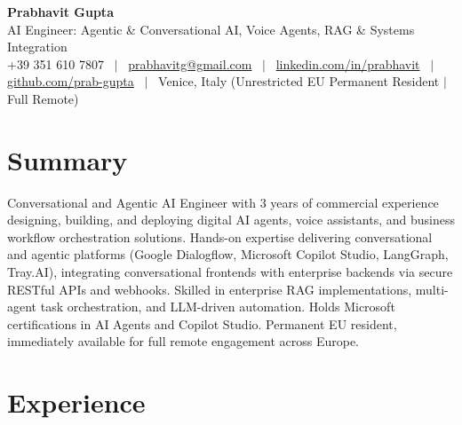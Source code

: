 \documentclass[a4paper,10pt]{article}
\begin{document}
\begin{minipage}[c]{0.80\textwidth}
  {\Huge\bfseries Prabhavit Gupta}\\[3pt]
  {\color{accent}\large AI Engineer: Agentic \& Conversational AI, Voice Agents, RAG \& Systems Integration}\\[6pt]
  {\footnotesize +39 351 610 7807 ~$\vert$~
  \href{mailto:prabhavitg@gmail.com}{prabhavitg@gmail.com} ~$\vert$~
  \href{https://www.linkedin.com/in/prabhavit/}{linkedin.com/in/prabhavit} ~$\vert$~
  \href{https://github.com/prab-gupta}{github.com/prab-gupta} ~$\vert$~
  Venice, Italy (Unrestricted EU Permanent Resident $\vert$ Full Remote)}
\end{minipage}\hfill

\section{Summary}
Conversational and Agentic AI Engineer with 3 years of commercial experience designing, building, and deploying digital AI agents, voice assistants, and business workflow orchestration solutions. Hands-on expertise delivering conversational and agentic platforms (Google Dialogflow, Microsoft Copilot Studio, LangGraph, Tray.AI), integrating conversational frontends with enterprise backends via secure RESTful APIs and webhooks. Skilled in enterprise RAG implementations, multi-agent task orchestration, and LLM-driven automation. Holds Microsoft certifications in AI Agents and Copilot Studio. Permanent EU resident, immediately available for full remote engagement across Europe.

\section{Experience}
\end{document}
